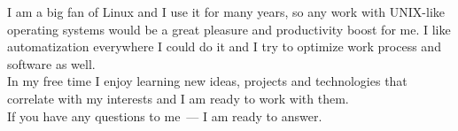      I am a big fan of Linux and I use it for many years,
      so any work with UNIX-like operating systems
      would be a great pleasure and productivity boost for me.
      I like automatization everywhere I could do it and I try to optimize
      work process and software as well. \\

      In my free time I enjoy learning new ideas, projects and technologies
      that correlate with my interests and I am ready to work with them. \\

      If you have any questions to me~--- I am ready to answer.

  \vfill


